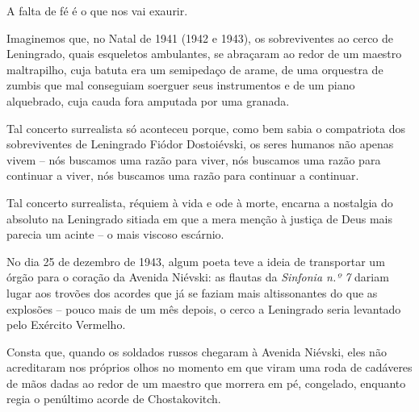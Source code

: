 A falta de fé é o que nos vai exaurir.

Imaginemos que, no Natal de 1941 (1942 e 1943), os sobreviventes ao
cerco de Leningrado, quais esqueletos ambulantes, se abraçaram ao redor
de um maestro maltrapilho, cuja batuta era um semipedaço de arame, de
uma orquestra de zumbis que mal conseguiam soerguer seus instrumentos e
de um piano alquebrado, cuja cauda fora amputada por uma granada.

Tal concerto surrealista só aconteceu porque, como bem sabia o
compatriota dos sobreviventes de Leningrado Fiódor Dostoiévski, os seres
humanos não apenas vivem -- nós buscamos uma razão para viver, nós
buscamos uma razão para continuar a viver, nós buscamos uma razão para
continuar a continuar.

Tal concerto surrealista, réquiem à vida e ode à morte, encarna a
nostalgia do absoluto na Leningrado sitiada em que a mera menção à
justiça de Deus mais parecia um acinte -- o mais viscoso escárnio.

No dia 25 de dezembro de 1943, algum poeta teve a ideia de transportar
um órgão para o coração da Avenida Niévski: as flautas da \emph{Sinfonia
n.º 7} dariam lugar aos trovões dos acordes que já se faziam mais
altissonantes do que as explosões -- pouco mais de um mês depois, o
cerco a Leningrado seria levantado pelo Exército Vermelho.

Consta que, quando os soldados russos chegaram à Avenida Niévski, eles
não acreditaram nos próprios olhos no momento em que viram uma roda de
cadáveres de mãos dadas ao redor de um maestro que morrera em pé,
congelado, enquanto regia o penúltimo acorde de Chostakovitch.


